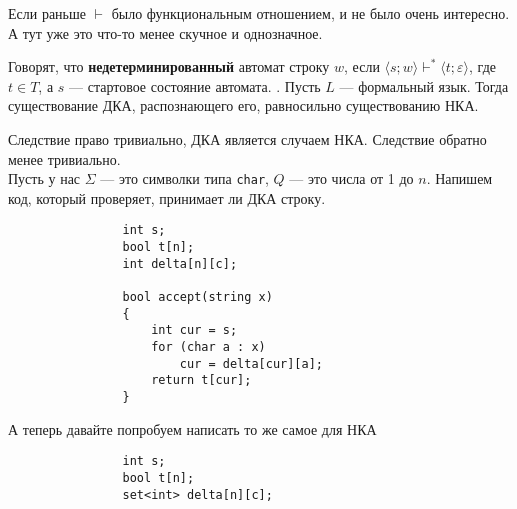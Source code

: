 \documentclass{article}
\begin{document}
\begin{itemize}
        \begin{Comment}
            Если раньше $\vdash$ было функциональным отношением, и не было очень интересно. А тут уже это что-то менее скучное и однозначное.
        \end{Comment}
        \dfn Говорят, что \textbf{недетерминированный} автомат  строку $w$, если $\langle s;w\rangle\vdash^*\langle t;\varepsilon\rangle$, где $t\in T$, а $s$ --- стартовое состояние автомата.
        \thm {}. Пусть $L$ --- формальный язык. Тогда существование ДКА, распознающего его, равносильно существованию НКА.
        \begin{Proof}
            Следствие право тривиально, ДКА является случаем НКА. Следствие обратно менее тривиально.\\
            Пусть у нас $\Sigma$ --- это символки типа \texttt{char}, $Q$ --- это числа от 1 до $n$. Напишем код, который проверяет, принимает ли ДКА строку.
            \begin{verbatim}
                int s;
                bool t[n];
                int delta[n][c];

                bool accept(string x)
                {
                    int cur = s;
                    for (char a : x)
                        cur = delta[cur][a];
                    return t[cur];
                }
            \end{verbatim}
            А теперь давайте попробуем написать то же самое для НКА
            \begin{verbatim}
                int s;
                bool t[n];
                set<int> delta[n][c];
                

\end{verbatim}
\end{Proof}
\end{itemize}
\end{document}
